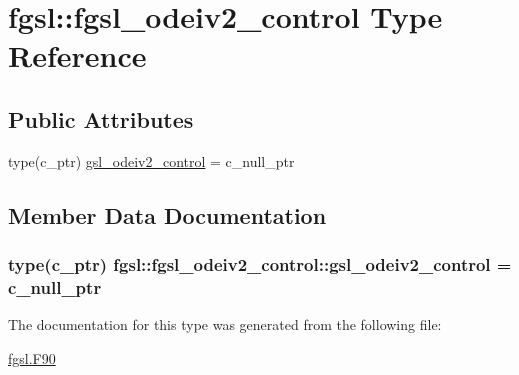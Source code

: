 \hypertarget{structfgsl_1_1fgsl__odeiv2__control}{}\section{fgsl\+:\+:fgsl\+\_\+odeiv2\+\_\+control Type Reference}
\label{structfgsl_1_1fgsl__odeiv2__control}
\subsection*{Public Attributes}
\begin{DoxyCompactItemize}
\item 
type(c\+\_\+ptr) \hyperlink{structfgsl_1_1fgsl__odeiv2__control_ada5ecddef7af921218d9d22dad8852c4}{gsl\+\_\+odeiv2\+\_\+control} = c\+\_\+null\+\_\+ptr
\end{DoxyCompactItemize}


\subsection{Member Data Documentation}
\hypertarget{structfgsl_1_1fgsl__odeiv2__control_ada5ecddef7af921218d9d22dad8852c4}{}
\subsubsection[{gsl\+\_\+odeiv2\+\_\+control}]{\setlength{\rightskip}{0pt plus 5cm}type(c\+\_\+ptr) fgsl\+::fgsl\+\_\+odeiv2\+\_\+control\+::gsl\+\_\+odeiv2\+\_\+control = c\+\_\+null\+\_\+ptr}\label{structfgsl_1_1fgsl__odeiv2__control_ada5ecddef7af921218d9d22dad8852c4}


The documentation for this type was generated from the following file\+:\begin{DoxyCompactItemize}
\item 
\hyperlink{fgsl_8F90}{fgsl.\+F90}\end{DoxyCompactItemize}
